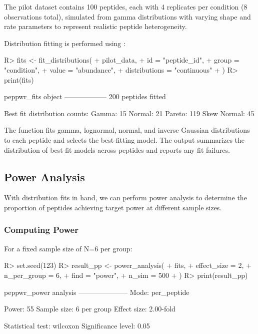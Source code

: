 \documentclass[article]{jss}
\begin{document}
The pilot dataset contains 100 peptides, each with 4 replicates per condition (8 observations total), simulated from gamma distributions with varying shape and rate parameters to represent realistic peptide heterogeneity.

Distribution fitting is performed using :

\begin{Schunk}
\begin{Sinput}
R> fits <- fit_distributions(
+    pilot_data,
+    id = "peptide_id",
+    group = "condition",
+    value = "abundance",
+    distributions = "continuous"
+  )
R> print(fits)
\end{Sinput}
\begin{Soutput}
peppwr_fits object
------------------
200 peptides fitted

Best fit distribution counts:
  Gamma: 15
  Normal: 21
  Pareto: 119
  Skew Normal: 45
\end{Soutput}
\end{Schunk}

The function fits gamma, lognormal, normal, and inverse Gaussian distributions to each peptide and selects the best-fitting model. The output summarizes the distribution of best-fit models across peptides and reports any fit failures.

\subsection{Power Analysis}

With distribution fits in hand, we can perform power analysis to determine the proportion of peptides achieving target power at different sample sizes.

\subsubsection{Computing Power}

For a fixed sample size of N=6 per group:

\begin{Schunk}
\begin{Sinput}
R> set.seed(123)
R> result_pp <- power_analysis(
+    fits,
+    effect_size = 2,
+    n_per_group = 6,
+    find = "power",
+    n_sim = 500
+  )
R> print(result_pp)
\end{Sinput}
\begin{Soutput}
peppwr_power analysis
---------------------
Mode: per_peptide

Power: 55%
Sample size: 6 per group
Effect size: 2.00-fold

Statistical test: wilcoxon
Significance level: 0.05
\end{Soutput}
\end{Schunk}
\end{document}
